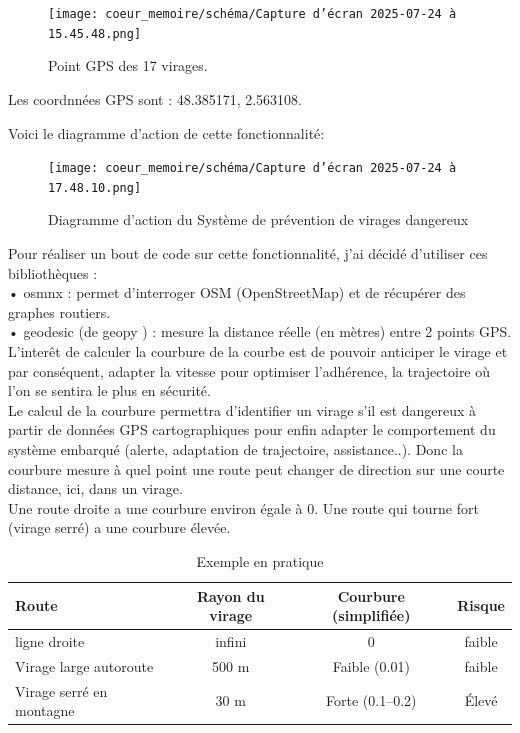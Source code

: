 \begin{figure}[H]
    \centering
    \texttt{[image: coeur\_memoire/schéma/Capture d’écran 2025-07-24 à 15.45.48.png]} 
    \caption{Point GPS des 17 virages.}
\end{figure}




Les coordnnées GPS sont : 48.385171, 2.563108.

Voici le diagramme d'action de cette fonctionnalité:\\

\begin{figure}[H]
    \centering
    \texttt{[image: coeur\_memoire/schéma/Capture d’écran 2025-07-24 à 17.48.10.png]} 
    \caption{Diagramme d'action du Système de prévention de virages dangereux}
\end{figure}

Pour réaliser un bout de code sur cette fonctionnalité, j'ai décidé d'utiliser ces bibliothèques :\\
• osmnx\cite{osm_doc} : permet d’interroger OSM (OpenStreetMap) et de récupérer des graphes routiers.\\
•	geodesic (de geopy \cite{geopy}) : mesure la distance réelle (en mètres) entre 2 points GPS.\\

L'interêt de calculer la courbure de la courbe est de pouvoir anticiper le virage et par conséquent, adapter la vitesse pour optimiser l'adhérence, la trajectoire où l'on se sentira le plus en sécurité. \\
Le calcul de la courbure permettra d'identifier un virage s'il est dangereux à partir de données GPS cartographiques pour enfin adapter le comportement du système embarqué (alerte, adaptation de trajectoire, assistance..).
Donc la courbure mesure à quel point une route peut changer de direction sur une courte distance, ici, dans un virage.\\
Une route droite a une courbure environ égale à 0. Une route qui tourne fort (virage serré) a une courbure élevée.

\begin{table}[ht]
\centering
\begin{tabular}{|l|c|c|c|}
\hline
Route & Rayon du virage & Courbure (simplifiée) & Risque \\
\hline
ligne droite & infini & 0 & faible \\
Virage large autoroute & 500 m & Faible (0.01) & faible \\
Virage serré en montagne & 30 m & Forte (0.1–0.2) & Élevé \\
\hline
\end{tabular}
\caption{Exemple en pratique}
\end{table}

